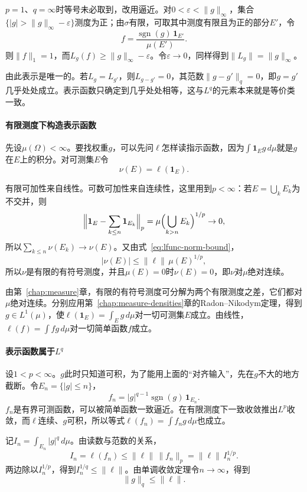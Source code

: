 $p=1$、$q=\infty$时等号未必取到，改用逼近。对$0<\varepsilon<\lVert g\rVert_\infty$，集合$\{\lvert g\rvert>\lVert g\rVert_\infty-\varepsilon\}$测度为正；由$\sigma$有限，可取其中测度有限且为正的部分$E'$，令
\[
f=\frac{\operatorname{sgn}(g)\,\mathbf{1}_{E'}}{\mu(E')}.
\]
则$\lVert f\rVert_1=1$，而$L_g(f)\geq\lVert g\rVert_\infty-\varepsilon$。令$\varepsilon\to0$，同样得到$\lVert L_g\rVert=\lVert g\rVert_\infty$。

由此表示是唯一的。若$L_g=L_{g'}$，则$L_{g-g'}=0$，其范数$\lVert g-g'\rVert_q=0$，即$g=g'$几乎处处成立。表示函数只确定到几乎处处相等，这与$L^q$的元素本来就是等价类一致。

\paragraph{有限测度下构造表示函数}
先设$\mu(\Omega)<\infty$。要找权重$g$，可以先问$\ell$怎样读指示函数，因为$\int\mathbf 1_Eg\,d\mu$就是$g$在$E$上的积分。对可测集$E$令
\[
\nu(E)=\ell(\mathbf{1}_E).
\]

有限可加性来自线性。可数可加性来自连续性，这里用到$p<\infty$：若$E=\bigcup_kE_k$为不交并，则
\[
\Bigl\lVert\mathbf{1}_E-\sum_{k\leq n}\mathbf{1}_{E_k}\Bigr\rVert_p=\mu\Bigl(\bigcup_{k>n}E_k\Bigr)^{1/p}\to0 ,
\]
所以$\sum_{k\leq n}\nu(E_k)\to\nu(E)$。又由式~\eqref{eq:lfunc-norm-bound}，
\[
\lvert\nu(E)\rvert\leq\lVert\ell\rVert\,\mu(E)^{1/p},
\]
所以$\nu$是有限的有符号测度，并且$\mu(E)=0$时$\nu(E)=0$，即$\nu$对$\mu$绝对连续。

由第~\ref{chap:measure}章，有限的有符号测度可分解为两个有限测度之差，它们都对$\mu$绝对连续。分别应用第~\ref{chap:measure-densities}章的Radon--Nikodym定理，得到$g\in L^1(\mu)$，使$\ell(\mathbf{1}_E)=\int_Eg\,d\mu$对一切可测集$E$成立。由线性，$\ell(f)=\int fg\,d\mu$对一切简单函数$f$成立。

\paragraph{表示函数属于\texorpdfstring{$L^q$}{Lq}}
设$1<p<\infty$。$g$此时只知道可积，为了能用上面的“对齐输入”，先在$g$不大的地方截断。令$E_n=\{\lvert g\rvert\leq n\}$，
\[
f_n=\lvert g\rvert^{q-1}\operatorname{sgn}(g)\,\mathbf{1}_{E_n}.
\]
$f_n$是有界可测函数，可以被简单函数一致逼近。在有限测度下一致收敛推出$L^p$收敛，而$\ell$连续、$g$可积，所以等式$\ell(f_n)=\int f_ng\,d\mu$也成立。

记$I_n=\int_{E_n}\lvert g\rvert^q\,d\mu$。由读数与范数的关系，
\[
I_n=\ell(f_n)\leq\lVert\ell\rVert\,\lVert f_n\rVert_p=\lVert\ell\rVert\,I_n^{1/p}.
\]
两边除以$I_n^{1/p}$，得到$I_n^{1/q}\leq\lVert\ell\rVert$。由单调收敛定理令$n\to\infty$，得到
\[
\lVert g\rVert_q\leq\lVert\ell\rVert .
\]

